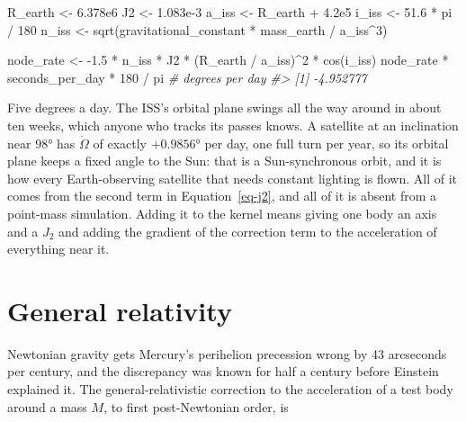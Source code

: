 \documentclass[
  10.5pt,
  letterpaper,
]{scrbook}
\newenvironment{Shaded}{\begin{snugshade}}{\end{snugshade}}
\newcommand{\CommentTok}[1]{\textcolor[rgb]{0.00,0.00,0.00}{\textit{#1}}}
\newcommand{\DecValTok}[1]{\textcolor[rgb]{0.00,0.00,0.00}{#1}}
\newcommand{\FloatTok}[1]{\textcolor[rgb]{0.00,0.00,0.00}{#1}}
\newcommand{\FunctionTok}[1]{\textcolor[rgb]{0.00,0.00,0.00}{#1}}
\newcommand{\NormalTok}[1]{\textcolor[rgb]{0.00,0.00,0.00}{#1}}
\newcommand{\OtherTok}[1]{\textcolor[rgb]{0.00,0.00,0.00}{#1}}
\newcommand{\SpecialCharTok}[1]{\textcolor[rgb]{0.00,0.00,0.00}{#1}}
\theoremstyle{plain}
\theoremstyle{remark}
\begin{document}
\begin{Shaded}
\begin{Highlighting}[]
\NormalTok{R\_earth }\OtherTok{\textless{}{-}} \FloatTok{6.378e6}
\NormalTok{J2      }\OtherTok{\textless{}{-}} \FloatTok{1.083e{-}3}
\NormalTok{a\_iss   }\OtherTok{\textless{}{-}}\NormalTok{ R\_earth }\SpecialCharTok{+} \FloatTok{4.2e5}
\NormalTok{i\_iss   }\OtherTok{\textless{}{-}} \FloatTok{51.6} \SpecialCharTok{*}\NormalTok{ pi }\SpecialCharTok{/} \DecValTok{180}
\NormalTok{n\_iss   }\OtherTok{\textless{}{-}} \FunctionTok{sqrt}\NormalTok{(gravitational\_constant }\SpecialCharTok{*}\NormalTok{ mass\_earth }\SpecialCharTok{/}\NormalTok{ a\_iss}\SpecialCharTok{\^{}}\DecValTok{3}\NormalTok{)}

\NormalTok{node\_rate }\OtherTok{\textless{}{-}} \SpecialCharTok{{-}}\FloatTok{1.5} \SpecialCharTok{*}\NormalTok{ n\_iss }\SpecialCharTok{*}\NormalTok{ J2 }\SpecialCharTok{*}\NormalTok{ (R\_earth }\SpecialCharTok{/}\NormalTok{ a\_iss)}\SpecialCharTok{\^{}}\DecValTok{2} \SpecialCharTok{*} \FunctionTok{cos}\NormalTok{(i\_iss)}
\NormalTok{node\_rate }\SpecialCharTok{*}\NormalTok{ seconds\_per\_day }\SpecialCharTok{*} \DecValTok{180} \SpecialCharTok{/}\NormalTok{ pi        }\CommentTok{\# degrees per day}
\CommentTok{\#\textgreater{} [1] {-}4.952777}
\end{Highlighting}
\end{Shaded}

Five degrees a day. The ISS's orbital plane swings all the way around in
about ten weeks, which anyone who tracks its passes knows. A satellite
at an inclination near \(98°\) has \(\dot\Omega\) of exactly
\(+0.9856°\) per day, one full turn per year, so its orbital plane keeps
a fixed angle to the Sun: that is a Sun-synchronous orbit, and it is how
every Earth-observing satellite that needs constant lighting is flown.
All of it comes from the second term in Equation~\ref{eq-j2}, and all of
it is absent from a point-mass simulation. Adding it to the kernel means
giving one body an axis and a \(J_2\) and adding the gradient of the
correction term to the acceleration of everything near it.

\section{General relativity}\label{general-relativity}

Newtonian gravity gets Mercury's perihelion precession wrong by 43
arcseconds per century, and the discrepancy was known for half a century
before Einstein explained it. The general-relativistic correction to the
acceleration of a test body around a mass \(M\), to first post-Newtonian
order, is
\end{document}
